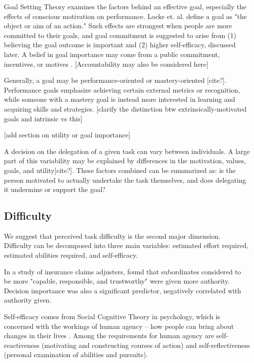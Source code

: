 \documentclass[letterpaper]{article} %
\begin{document}
Goal Setting Theory examines the factors behind an effective goal, especially the effects of conscious motivation on performance. Locke et. al. define a goal as "the object or aim of an action." Such effects are strongest when people are more committed to their goals, and goal commitment is suggested to arise from (1) believing the goal outcome is important and (2) higher self-efficacy, discussed later. A belief in goal importance may come from a public commitment, incentives, or motives \cite{locke-goal}. [Accountability may also be considered here]

Generally, a goal may be performance-oriented or mastery-oriented [cite?]. Performance goals emphasize achieving certain external metrics or recognition, while someone with a mastery goal is instead more interested in learning and acquiring skills and strategies. [clarify the distinction btw extrinsically-motivated goals and intrinsic vs this]

[add section on utility or goal importance] 

A decision on the delegation of a given task can vary between individuals. A large part of this variability may be explained by differences in the motivation, values, goals, and utility[cite?]. These factors combined can be summarized as: is the person motivated to actually undertake the task themselves, and does delegating it undermine or support the goal?

\subsection{Difficulty}
We suggest that perceived task difficulty is the second major dimension. Difficulty can be decomposed into three main variables: estimated effort required, estimated abilities required, and self-efficacy.

In a study of insurance claims adjusters, \cite{leana1986predictors} found that subordinates considered to be more "capable, responsible, and trustworthy" were given more authority. Decision importance was also a significant predictor, negatively correlated with authority given.


Self-efficacy comes from Social Cognitive Theory in psychology, which is concerned with the workings of human agency -- how people can bring about changes in their lives \cite{Bandura-agency}. Among the requirements for human agency are self-reactiveness (motivating and constructing courses of action) and self-reflectiveness (personal examination of abilities and pursuits). %
\end{document}

